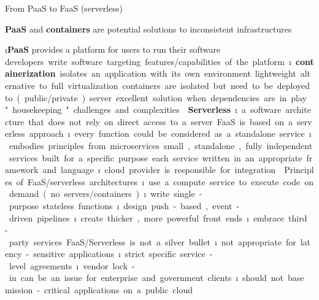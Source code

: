\begin{frame}[allowframebreaks]{From PaaS to FaaS (serverless)}

\textbf{PaaS} and \textbf{containers} are potential solutions to inconsistent infrastructures

\i \textbf{PaaS} provides a platform for users to run their software
\si developers write software targeting features/capabilities of the platform

\i \textbf{containerization} isolates an application with its own environment
\si lightweight alternative to full virtualization
\si containers are isolated but need to be deployed to (public/private) server
\si excellent solution when dependencies are in play
\si "housekeeping" challenges and complexities


\framebreak


\textbf{Serverless}
\i a software architecture that does not rely on direct access to a server

FaaS is based on a serverless approach
\i every function could be considered as a standalone service
\i embodies principles from microservices
\si small, standalone, fully independent services built for a specific purpose
\si each service written in an appropriate framework and language
\i cloud provider is responsible for integration 

\framebreak

Principles of FaaS/serverless architectures
\i use a compute service to execute code on demand (no servers/containers)
\i write single-purpose stateless functions
\i design push-based, event-driven pipelines
\i create thicker, more powerful front ends
\i embrace third-party services

FaaS/Serverless is not a silver bullet
\i not appropriate for latency-sensitive applications 
\i strict specific service-level agreements
\i vendor lock-in can be an issue for enterprise and government clients
\i should not base mission-critical applications on a public cloud


\end{frame}
